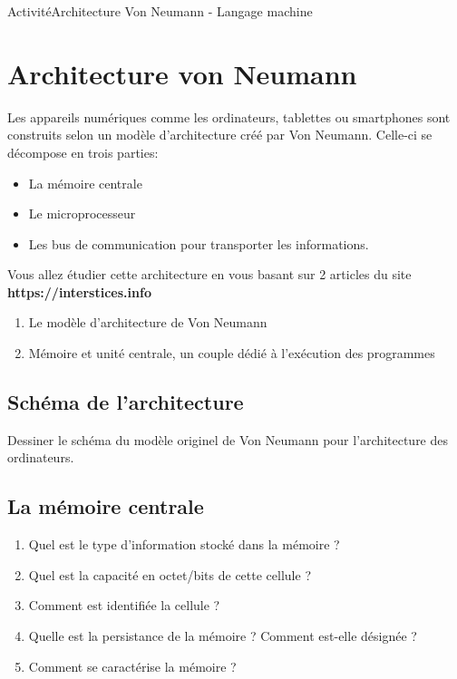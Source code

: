 \documentclass[11pt,a4paper]{article}
\begin{document}
\begin{NSI}
{Activité}{Architecture Von Neumann - Langage machine}
\end{NSI}


\section{Architecture von Neumann}

Les appareils numériques comme les ordinateurs, tablettes ou smartphones sont construits selon un modèle d'architecture créé par Von Neumann. Celle-ci se décompose en trois parties:
\begin{itemize}
\item La mémoire centrale
\item Le microprocesseur
\item Les bus de communication pour transporter les informations.
\end{itemize}

Vous allez étudier cette architecture en vous basant sur 2 articles du site \textbf{https://interstices.info}
\begin{enumerate}
\item Le modèle d'architecture de Von Neumann
\item Mémoire et unité centrale, un couple dédié à l'exécution des programmes
\end{enumerate}


\subsection*{Schéma de l'architecture}

Dessiner le schéma du modèle originel de Von Neumann pour l'architecture des ordinateurs. \vspace{8cm}

\subsection*{La mémoire centrale}

\begin{enumerate}
\item Quel est le type d'information stocké dans la mémoire ? \vspace{2cm}
\item Quel est la capacité en octet/bits de cette cellule ?\vspace{2cm}
\item Comment est identifiée la cellule ? \vspace{2cm}

\item Quelle est la persistance de la mémoire ?  Comment est-elle désignée ?\vspace{2cm}

\item Comment se caractérise la mémoire ? \vspace{3cm}
\end{enumerate}
\end{document}
